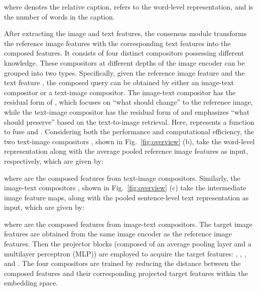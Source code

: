 \documentclass[sigconf]{acmart}
\begin{document}
where  denotes the relative caption,  refers to the word-level representation, and  is the number of words in the caption.

\iffalse
Then, we use average pooling layer followed by a distinct MLP layer, denoted as  to project the mid-level and high-level feature maps of the reference image onto an embedding space with the dimension of :

where . 
Similarly, the text features are projected onto the embedding space with the same dimension:

where  are sentence-level representations. To note that the MLP layer are distinguished from each other, although they share the same notation .
\fi
 
After extracting the image and text features, the consensus module transforms the reference image features with the corresponding text features into the composed features. It consists of four distinct compositors possessing different knowledge. These compositors at different depths of the image encoder can be grouped into two types. Specifically, given the reference image feature  and the text feature , the composed query  can be obtained by either an image-text compositor or a text-image compositor. The image-text compositor has the residual form of , which focuses on ``what should change'' to the reference image, while the text-image compositor has the residual form of  and emphasizes ``what should preserve'' based on the text-to-image retrieval. Here,  represents a function to fuse  and . Considering both the performance and computational efficiency, the two text-image compositors , shown in Fig.~\ref{fig:overview} (b), take the word-level representation  along with the average pooled reference image features  as input, respectively, which are given by:

where  are the composed features from text-image compositors. Similarly, the image-text compositors , shown in Fig.~\ref{fig:overview} (c) take the intermediate image feature maps,  along with the pooled sentence-level text representation  as input, which are given by:

where  are the composed features from image-text compositors.
The target image features  are obtained from the same image encoder  as the reference image features. Then the projector blocks (composed of an average pooling layer and a multilayer perceptron (MLP)) are employed to acquire the target features: , , , and . The four compositors are trained by reducing the distance between the composed features and their corresponding projected target features within the embedding space.
\end{document}
